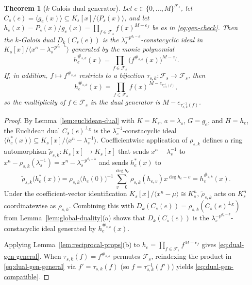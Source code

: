 \documentclass[preprint,12pt]{elsarticle}
\newcommand{\Fs}{\mathcal F_s}
\newcommand{\perpE}{\perp_E}
\newcommand{\Dk}{D_k}
\numberwithin{equation}{section}
\theoremstyle{plain}
\newtheorem{theorem}{Theorem}[section]
\theoremstyle{definition}
\theoremstyle{remark}
\begin{document}
\begin{theorem}[\texorpdfstring{$k$}{k}-Galois dual generator]\label{thm:dual-generator}
Let $e\in\{0,\dots,M\}^{\Fs}$, let $C_s(e)=\langle g_e(x)\rangle\subseteq K_s[x]/\langle P_s(x)\rangle$,
and let $h_e(x)=P_s(x)/g_e(x)=\prod_{f\in\Fs}f(x)^{M-e_f}$ be as in
\eqref{eq:gen-check}. Then the $k$-Galois dual $\Dk(C_s(e))$ is the
$\lambda_s^{-p^{d_s-k}}$-constacyclic ideal in
$K_s[x]/\langle x^n-\lambda_s^{-p^{d_s-k}}\rangle$ generated by the monic
polynomial
\begin{equation}\label{eq:dual-gen-general}
h_e^{\#_{s,k}}(x)=\prod_{f\in\Fs}\bigl(f^{\#_{s,k}}(x)\bigr)^{M-e_f}.
\end{equation}
If, in addition, $f\mapsto f^{\#_{s,k}}$ restricts to a bijection
$\tau_{s,k}:\Fs\to\Fs$, then
\begin{equation}\label{eq:dual-gen-compatible}
h_e^{\#_{s,k}}(x)=\prod_{f\in\Fs} f(x)^{\,M-e_{\tau_{s,k}^{-1}(f)}},
\end{equation}
so the multiplicity of $f\in\Fs$ in the dual generator is $M-e_{\tau_{s,k}^{-1}(f)}$.
\end{theorem}

\begin{proof}
By Lemma~\ref{lem:euclidean-dual} with $K=K_s$, $a=\lambda_s$, $G=g_e$, and
$H=h_e$, the Euclidean dual $C_s(e)^{\perpE}$ is the $\lambda_s^{-1}$-constacyclic
ideal $\langle h_e^*(x)\rangle\subseteq K_s[x]/\langle x^n-\lambda_s^{-1}\rangle$.
Coefficientwise application of $\rho_{s,k}$ defines a ring automorphism
$\widetilde{\rho}_{s,k}:K_s[x]\to K_s[x]$ that sends $x^n-\lambda_s^{-1}$ to
$x^n-\rho_{s,k}(\lambda_s^{-1})=x^n-\lambda_s^{-p^{d_s-k}}$ and sends $h_e^*(x)$
to
\[
\widetilde{\rho}_{s,k}\bigl(h_e^*(x)\bigr)
 =\rho_{s,k}\bigl(h_e(0)\bigr)^{-1}
   \sum_{v=0}^{\deg h_e}\rho_{s,k}(h_{e,v})x^{\deg h_e-v}
 =h_e^{\#_{s,k}}(x).
\]
Under the coefficient-vector identification $K_s[x]/\langle x^n-\mu\rangle\cong K_s^n$,
$\widetilde{\rho}_{s,k}$ acts on $K_s^n$ coordinatewise as $\rho_{s,k}$.
Combining this with $\Dk(C_s(e))=\rho_{s,k}(C_s(e)^{\perpE})$ from
Lemma~\ref{lem:global-duality}\textup{(a)} shows that $\Dk(C_s(e))$ is the
$\lambda_s^{-p^{d_s-k}}$-constacyclic ideal generated by $h_e^{\#_{s,k}}(x)$.

Applying Lemma~\ref{lem:reciprocal-props}\textup{(b)} to
$h_e=\prod_{f\in\Fs}f^{M-e_f}$ gives \eqref{eq:dual-gen-general}. When
$\tau_{s,k}(f)=f^{\#_{s,k}}$ permutes $\Fs$, reindexing the product in
\eqref{eq:dual-gen-general} via $f'=\tau_{s,k}(f)$ (so $f=\tau_{s,k}^{-1}(f')$)
yields \eqref{eq:dual-gen-compatible}.
\end{proof}
\end{document}
